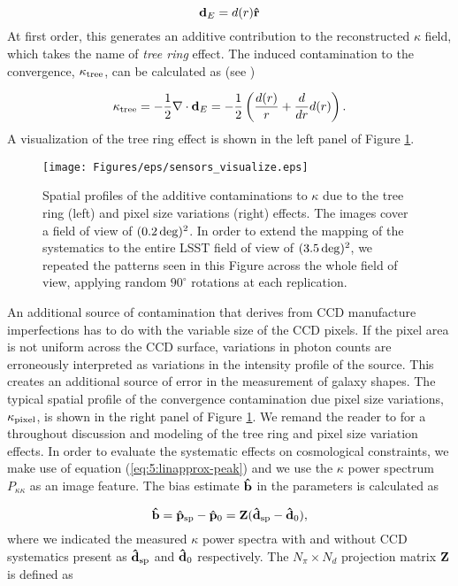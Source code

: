 \begin{equation}
\label{eq:7:displ}
\mathbf{d}_E = d(r)\mathbf{\hat{r}}
\end{equation}
%
At first order, this generates an additive contribution to the reconstructed $\kappa$ field, which takes the name of \textit{tree ring} effect. The induced contamination to the convergence, $\kappa_{\rm tree}$, can be calculated as (see \citep{PetriCCD})

\begin{equation}
\label{eq:7:ktree}
\kappa_{\rm tree} = -\frac{1}{2}\nabla\cdot\mathbf{d}_E = -\frac{1}{2}\left(\frac{d(r)}{r}+\frac{d}{dr}d(r)\right).
\end{equation}   
%
A visualization of the tree ring effect is shown in the left panel of Figure \ref{fig:7:sensvis}. 
%
\begin{figure}
\begin{center}
\texttt{[image: Figures/eps/sensors\_visualize.eps]}
\end{center}
\caption{Spatial profiles of the additive contaminations to $\kappa$ due to the tree ring (left) and pixel size variations (right) effects. The images cover a field of view of $(0.2\,{\rm deg})^2$. In order to extend the mapping of the systematics to the entire LSST field of view of $(3.5\,{\rm deg})^2$, we repeated the patterns seen in this Figure across the whole field of view, applying random $90^\circ$ rotations at each replication.}
\label{fig:7:sensvis}
\end{figure}
%
An additional source of contamination that derives from CCD manufacture imperfections has to do with the variable size of the CCD pixels. If the pixel area is not uniform across the CCD surface, variations in photon counts are erroneously interpreted as variations in the intensity profile of the source. This creates an additional source of error in the measurement of galaxy shapes. The typical spatial profile of the convergence contamination due pixel size variations, $\kappa_{\rm pixel}$, is shown in the right panel of Figure \ref{fig:7:sensvis}. We remand the reader to \citep{PetriCCD} for a throughout discussion and modeling of the tree ring and pixel size variation effects. In order to evaluate the systematic effects on cosmological constraints, we make use of equation (\ref{eq:5:linapprox-peak}) and we use the $\kappa$ power spectrum $P_{\kappa\kappa}$ as an image feature. The bias estimate $\mathbf{\hat{b}}$ in the parameters is calculated as 

\begin{equation}
\label{eq:7:biasccd}
\mathbf{\hat{b}} = \mathbf{\hat{p}}_{\rm sp}-\mathbf{\hat{p}}_0 = \mathbf{Z}(\mathbf{\hat{d}}_{\rm sp}-\mathbf{\hat{d}}_0),
\end{equation}
%
where we indicated the measured $\kappa$ power spectra with and without CCD systematics present as $\mathbf{\hat{d}}_{\rm sp}$ and $\mathbf{\hat{d}}_0$ respectively. The $N_\pi\times N_d$ projection matrix $\mathbf{Z}$ is defined as 

